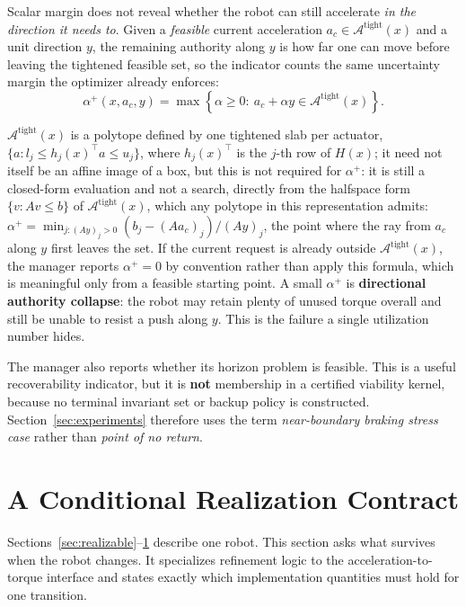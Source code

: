 \documentclass[journal]{IEEEtran}
\begin{document}
Scalar margin does not reveal whether the robot can still accelerate \emph{in the direction it needs to}. Given a \emph{feasible} current acceleration $a_c\in\mathcal A^{\mathrm{tight}}(x)$ and a unit direction $y$, the remaining authority along $y$ is how far one can move before leaving the tightened feasible set, so the indicator counts the same uncertainty margin the optimizer already enforces:
\[
\alpha^{+}(x,a_c,y)=\max\left\{\alpha\ge0:\ a_c+\alpha y\in\mathcal A^{\mathrm{tight}}(x)\right\}.
\]

$\mathcal A^{\mathrm{tight}}(x)$ is a polytope defined by one tightened slab per actuator, $\{a:l_j\le h_j(x)^\top a\le u_j\}$, where $h_j(x)^\top$ is the $j$-th row of $H(x)$; it need not itself be an affine image of a box, but this is not required for $\alpha^+$: it is still a closed-form evaluation and not a search, directly from the halfspace form $\{v:Av\le b\}$ of $\mathcal A^{\mathrm{tight}}(x)$, which any polytope in this representation admits: $\alpha^{+}=\min_{j:(Ay)_j>0}(b_j-(Aa_c)_j)/(Ay)_j$, the point where the ray from $a_c$ along $y$ first leaves the set. If the current request is already outside $\mathcal A^{\mathrm{tight}}(x)$, the manager reports $\alpha^{+}=0$ by convention rather than apply this formula, which is meaningful only from a feasible starting point. A small $\alpha^{+}$ is \textbf{directional authority collapse}: the robot may retain plenty of unused torque overall and still be unable to resist a push along $y$. This is the failure a single utilization number hides.

The manager also reports whether its horizon problem is feasible. This is a useful recoverability indicator, but it is \textbf{not} membership in a certified viability kernel, because no terminal invariant set or backup policy is constructed. Section~\ref{sec:experiments} therefore uses the term \emph{near-boundary braking stress case} rather than \emph{point of no return}.

\section{A Conditional Realization Contract}
\label{sec:certificate}

Sections~\ref{sec:realizable}--\ref{sec:certificate} describe one robot. This section asks what survives when the robot changes. It specializes refinement logic to the acceleration-to-torque interface and states exactly which implementation quantities must hold for one transition.
\end{document}
